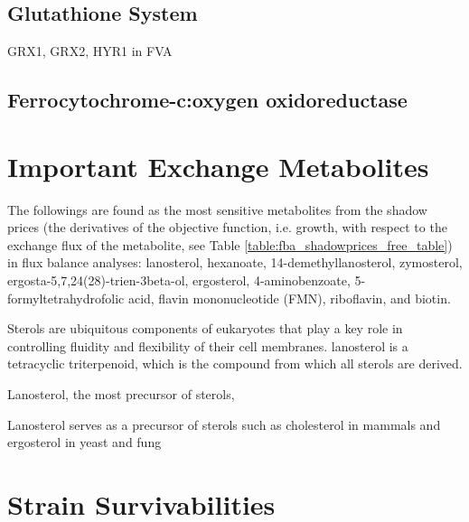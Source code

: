\subsection{Glutathione System}
GRX1, GRX2, HYR1 in FVA

\subsection{Ferrocytochrome-c:oxygen oxidoreductase}

\section{Important Exchange Metabolites}
The followings are found as the most sensitive metabolites from the shadow prices (the derivatives of the objective function, i.e. growth, with respect to the exchange flux of the metabolite, see Table \ref{table:fba_shadowprices_free_table}) in flux balance analyses: lanosterol, hexanoate, 14-demethyllanosterol, zymosterol, ergosta-5,7,24(28)-trien-3beta-ol, ergosterol, 4-aminobenzoate, 5-formyltetrahydrofolic acid, flavin mononucleotide (FMN), riboflavin, and biotin.

Sterols are ubiquitous components of eukaryotes that play a key role in controlling fluidity and flexibility of their cell membranes. lanosterol is a tetracyclic triterpenoid, which is the compound from which all sterols are derived.

Lanosterol, the most  precursor of sterols,

Lanosterol serves as a precursor of sterols such as cholesterol in mammals and ergosterol in yeast and fung


\section{Strain Survivabilities}
